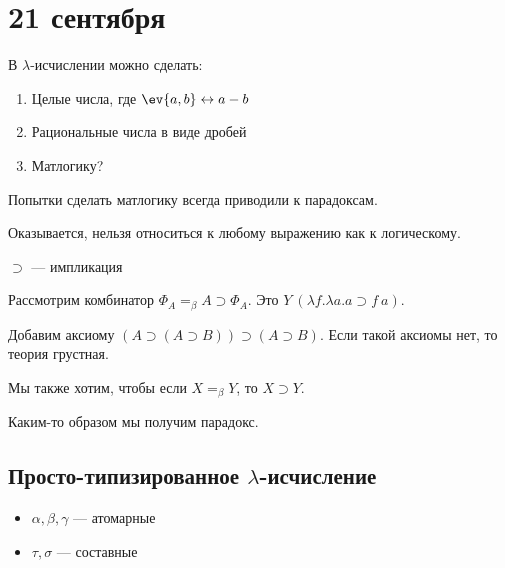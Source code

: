 \chapter{21 сентября}

В \(\lambda\)-исчислении можно сделать:
\begin{enumerate}
    \item Целые числа, где \(\ev{a, b} \leftrightarrow a - b\)
    \item Рациональные числа в виде дробей
    \item Матлогику?
\end{enumerate}

Попытки сделать матлогику всегда приводили к парадоксам.

Оказывается, нельзя относиться к любому выражению как к логическому.

\begin{notation}
    \(\supset\) --- импликация
\end{notation}

\begin{example}
    Рассмотрим комбинатор \(\Phi_A =_\beta A \supset \Phi_A\). Это \(Y\ (\lambda f.\lambda a.a \supset f\ a)\).

    Добавим аксиому \((A \supset (A \supset B)) \supset (A \supset B)\). Если такой аксиомы нет, то теория грустная.

    Мы также хотим, чтобы если \(X =_\beta Y\), то \(X \supset Y\).

    Каким-то образом мы получим парадокс.
\end{example}

\section{Просто-типизированное \(\lambda\)-исчисление}

\begin{definition}\itemfix
    \begin{itemize}
        \item \(\alpha, \beta, \gamma\) --- атомарные
        \item \(\tau, \sigma\) --- составные
    \end{itemize}
\end{definition}

